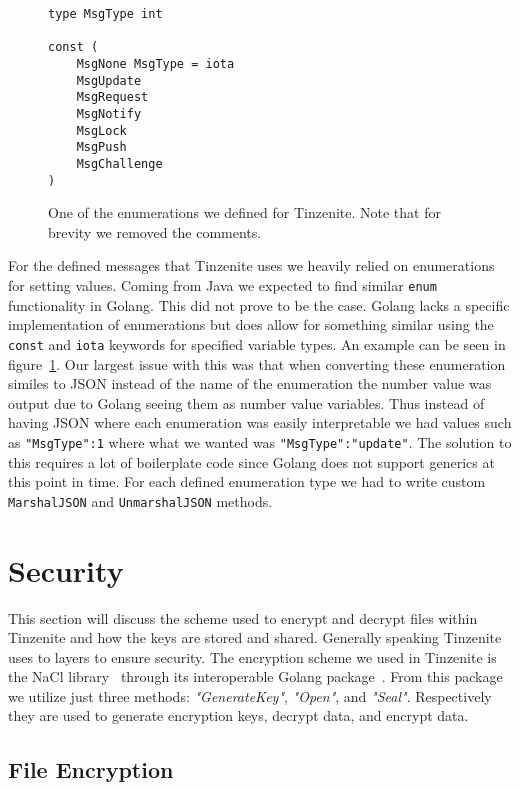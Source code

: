 \begin{figure}[htp]
    \begin{lstlisting}[language=golang,firstnumber=0]
type MsgType int

const (
	MsgNone MsgType = iota
	MsgUpdate
	MsgRequest
	MsgNotify
	MsgLock
	MsgPush
	MsgChallenge
)
    \end{lstlisting}
\caption[Golang Enum Example]{One of the enumerations we defined for Tinzenite. Note that for brevity we removed the comments.}
\label{golang:enum_example}
\end{figure}

For the defined messages that Tinzenite uses we heavily relied on enumerations for setting values.
Coming from Java we expected to find similar \texttt{enum} functionality in Golang.
This did not prove to be the case.
Golang lacks a specific implementation of enumerations but does allow for something similar using the \texttt{const} and \texttt{iota} keywords for specified variable types.
An example can be seen in figure~\ref{golang:enum_example}.
Our largest issue with this was that when converting these enumeration similes to JSON instead of the name of the enumeration the number value was output due to Golang seeing them as number value variables.
Thus instead of having JSON where each enumeration was easily interpretable we had values such as \texttt{"MsgType":1} where what we wanted was \texttt{"MsgType":"update"}.
The solution to this requires a lot of boilerplate code since Golang does not support generics at this point in time.
For each defined enumeration type we had to write custom \texttt{MarshalJSON} and \texttt{UnmarshalJSON} methods.

\section{Security}
\label{sec:Security}

This section will discuss the scheme used to encrypt and decrypt files within Tinzenite and how the keys are stored and shared.
Generally speaking Tinzenite uses to layers to ensure security.
The encryption scheme we used in Tinzenite is the NaCl library~\cite{bernstein2012security} through its interoperable Golang package~\cite{web:site:golang:box}.%
From this package we utilize just three methods: \textit{"GenerateKey"}, \textit{"Open"}, and \textit{"Seal"}.
Respectively they are used to generate encryption keys, decrypt data, and encrypt data.

\subsection{File Encryption}
\label{sub:File Encryption}

